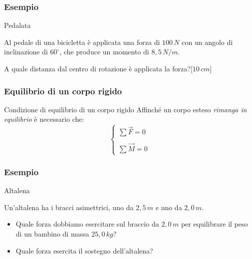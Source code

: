 \documentclass[]{beamer}
\theoremstyle{plain}
\begin{document}
\begin{frame}
\frametitle{Esempio}
\begin{exampleblock}{Pedalata}
  \small{Al pedale di una bicicletta è applicata una forza di $ 100 \, N $ con un angolo di inclinazione di $ 60^\circ $, che produce un momento di $ 8,5 \, N/m $.

  A quale distanza dal centro di rotazione è applicata la forza?\hspace*{\fill}[$ 10 \, cm $]}
\end{exampleblock}
\end{frame}


\begin{frame}
\frametitle{Equilibrio di un corpo rigido}
\begin{block}{Condizione di equilibrio di un corpo rigido}
Affinché un corpo esteso \emph{rimanga in equilibrio} è necessario che:
\[ \left\{ 
  \begin{array}{l}
  \sum \vec{F} = 0\\
  \,\\
  \sum \vec{M} = 0
  \end{array}
  \right.  \]
\end{block}
\end{frame}

\begin{frame}
\frametitle{Esempio}
\begin{exampleblock}{Altalena}
{\small Un'altalena ha i bracci asimettrici, uno da $ 2,5 \, m $ e uno da $ 2,0 \, m $.
\begin{itemize}
  \item Quale forza dobbiamo esercitare sul braccio da $ 2,0 \, m $ per equilibrare il peso di un bambino di massa $ 25,0 \, kg $?
  \item Quale forza esercita il sostegno dell'altalena?
\end{itemize}}
\end{exampleblock}
\end{frame}
\end{document}

